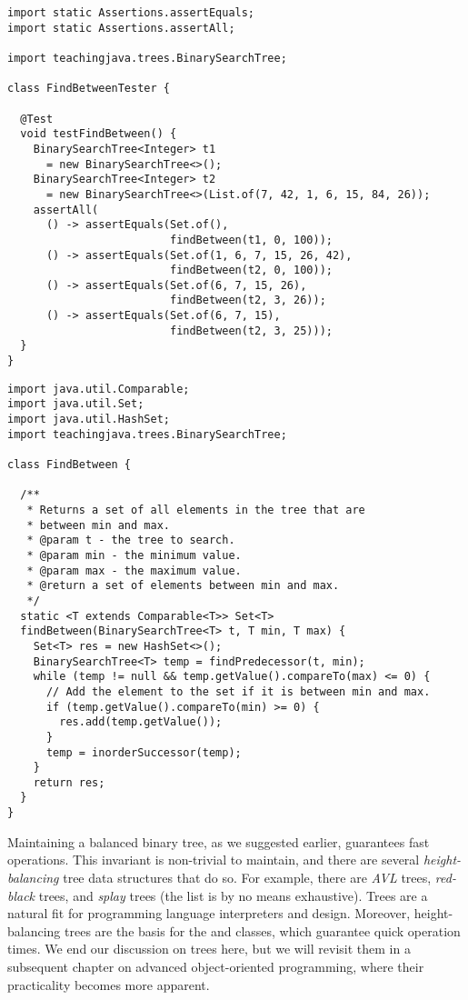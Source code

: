 \begin{lstlisting}[language=MyJava]
import static Assertions.assertEquals;
import static Assertions.assertAll;

import teachingjava.trees.BinarySearchTree;

class FindBetweenTester {

  @Test
  void testFindBetween() {
    BinarySearchTree<Integer> t1 
      = new BinarySearchTree<>();
    BinarySearchTree<Integer> t2 
      = new BinarySearchTree<>(List.of(7, 42, 1, 6, 15, 84, 26));
    assertAll(
      () -> assertEquals(Set.of(), 
                         findBetween(t1, 0, 100));
      () -> assertEquals(Set.of(1, 6, 7, 15, 26, 42), 
                         findBetween(t2, 0, 100));
      () -> assertEquals(Set.of(6, 7, 15, 26), 
                         findBetween(t2, 3, 26));
      () -> assertEquals(Set.of(6, 7, 15), 
                         findBetween(t2, 3, 25)));
  }
}
\end{lstlisting}

\begin{lstlisting}[language=MyJava]
import java.util.Comparable;
import java.util.Set;
import java.util.HashSet;
import teachingjava.trees.BinarySearchTree;

class FindBetween {

  /**
   * Returns a set of all elements in the tree that are 
   * between min and max.
   * @param t - the tree to search.
   * @param min - the minimum value.
   * @param max - the maximum value.
   * @return a set of elements between min and max.
   */
  static <T extends Comparable<T>> Set<T> 
  findBetween(BinarySearchTree<T> t, T min, T max) {
    Set<T> res = new HashSet<>();
    BinarySearchTree<T> temp = findPredecessor(t, min);
    while (temp != null && temp.getValue().compareTo(max) <= 0) {
      // Add the element to the set if it is between min and max.
      if (temp.getValue().compareTo(min) >= 0) {
        res.add(temp.getValue());
      }
      temp = inorderSuccessor(temp);
    }
    return res;
  }
}
\end{lstlisting}

Maintaining a balanced binary tree, as we suggested earlier, guarantees fast operations. 
This invariant is non-trivial to maintain, and there are several \emph{height-balancing} tree data structures that do so. 
For example, there are \emph{AVL} trees, \emph{red-black} trees, and \emph{splay} trees (the list is by no means exhaustive). 
Trees are a natural fit for programming language interpreters and design. Moreover, height-balancing trees are the basis for the  and  classes, which guarantee quick operation times.
We end our discussion on trees here, but we will revisit them in a subsequent chapter on advanced object-oriented programming, where their practicality becomes more apparent.